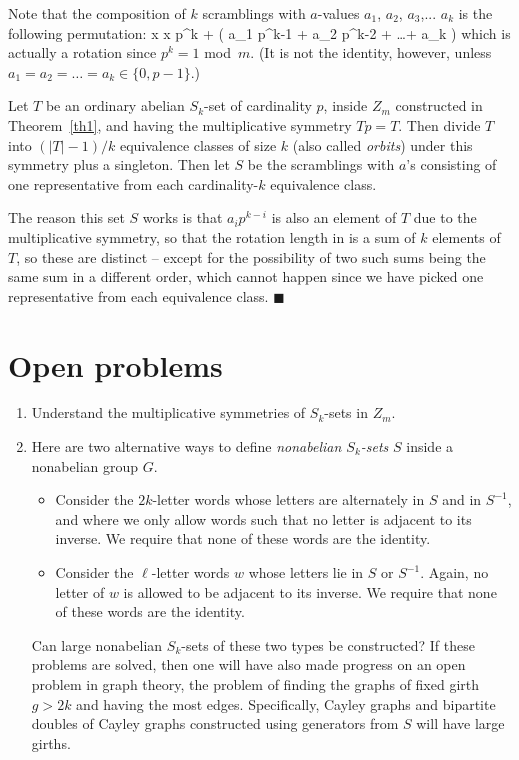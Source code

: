 Note that the composition of $k$ scramblings
with $a$-values $a_1$, $a_2$, $a_3$,... $a_k$ is the following permutation:
   x \rightarrow x p^k + ( a_1 p^{k-1} + a_2 p^{k-2} + \dots + a_k )
\eeq
which is actually a rotation since $p^k=1$ mod~$m$. (It is not
the identity, however, unless $a_1 = a_2 = \dots = a_k \in \{ 0 , p-1
\}$.)

Let $T$ be an ordinary abelian $S_k$-set
of cardinality $p$, inside $Z_m$ constructed in Theorem~\ref{th1},
and having the multiplicative symmetry $Tp = T$.
Then divide $T$
into $(|T|-1)/k$ equivalence classes of size $k$
(also called {\em orbits}) under this symmetry
plus a singleton. Then let $S$
be the scramblings with $a$'s consisting of one representative from
each cardinality-$k$ equivalence class.

The reason this set $S$ works is that $a_i p^{k-i}$ is also
an element of $T$ due to the multiplicative symmetry, so that
the rotation length in 
is a sum of $k$ elements of $T$, so these
are distinct -- except for the possibility of two such sums being
the same sum in a different order, which cannot happen since
we have picked one representative from each equivalence class. \hfill $\blacksquare$

\section{Open problems}
\begin{enumerate}
\item Understand the multiplicative symmetries of $S_k$-sets
in $Z_m$.

\item Here are two alternative ways to define {\em nonabelian
$S_k$-sets} $S$ inside a nonabelian group $G$.
\begin{itemize}
\item Consider the $2k$-letter words whose letters
are alternately in $S$ and in $S^{-1}$,
and where we only allow words such that no letter is adjacent
to its inverse. We require that none of these words are the identity.

\item Consider the $\ell$-letter words $w$ whose letters lie
in $S$ or $S^{-1}$.
Again, no letter of $w$ is allowed to be adjacent to its inverse.
We require that none of these words are the identity.
\end{itemize}
Can large nonabelian $S_k$-sets of these two types be constructed?
If these problems are solved, then one will have also made progress on
an open problem in graph theory, the problem of finding the graphs
of fixed girth $g > 2k$ and having the most edges. Specifically,
Cayley graphs and bipartite doubles of Cayley graphs constructed
using generators from $S$ will have large girths.
\end{enumerate}

